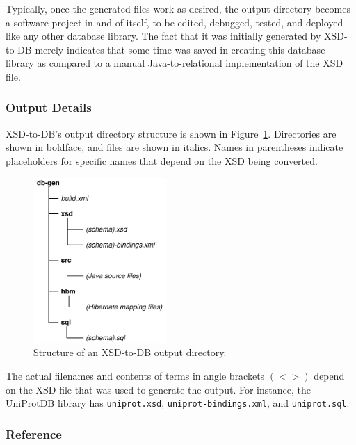 \documentclass[11pt]{article}
\begin{document}
Typically, once the generated files work as desired, the output directory becomes a software project in and of itself, to be edited, debugged, tested, and deployed like any other database library.  The fact that it was initially generated by XSD-to-DB merely indicates that some time was saved in creating this database library as compared to a manual Java-to-relational implementation of the XSD file.

\subsubsection{Output Details}

XSD-to-DB's output directory structure is shown in Figure~\ref{output}.  Directories are shown in boldface, and files are shown in italics.  Names in parentheses indicate placeholders for specific names that depend on the XSD being converted.

\begin{figure}[htbp] %
   \centering
   \includegraphics[width=2in]{figures/db-gen.pdf} 
   \caption{Structure of an XSD-to-DB output directory.}
   \label{output}
\end{figure}

The actual filenames and contents of terms in angle brackets $(< >)$ depend on the XSD file that was used to generate the output.  For instance, the UniProtDB library has \texttt{uniprot.xsd}, \texttt{uniprot-bindings.xml}, and \texttt{uniprot.sql}.

\subsubsection{Reference}
\end{document}
